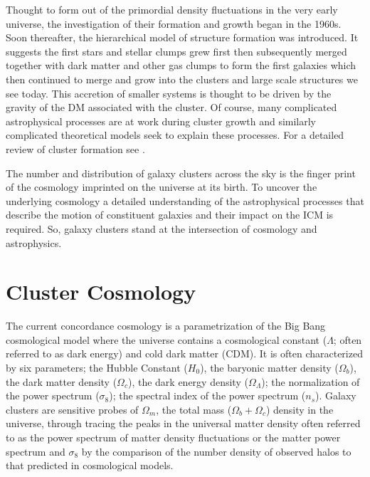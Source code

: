 Thought to form out of the primordial density fluctuations in the very early universe, the investigation of their formation and growth began in the 1960s. Soon thereafter, the hierarchical model of structure formation \citep{Press1974, Gott1975, White1978} was introduced. It suggests the first stars and stellar clumps grew first then subsequently merged together with dark matter and other gas clumps to form the first galaxies which then continued to merge and grow into the clusters and large scale structures we see today. This accretion of smaller systems is thought to be driven by the gravity of the DM associated with the cluster. Of course, many complicated astrophysical processes are at work during cluster growth and similarly complicated theoretical models seek to explain these processes. For a detailed review of cluster formation see \cite{Kravtsov2012}.

The number and distribution of galaxy clusters across the sky is the finger print of the cosmology imprinted on the universe at its birth. To uncover the underlying cosmology a detailed understanding of the astrophysical processes that describe the motion of constituent galaxies and their impact on the ICM is required. So, galaxy clusters stand at the intersection of cosmology and astrophysics. 

\section{Cluster Cosmology}
The current concordance cosmology is a parametrization of the Big Bang cosmological model where the universe contains a cosmological constant ($\Lambda$; often referred to as dark energy) and cold dark matter (CDM). It is often characterized by six parameters; the Hubble Constant ($H_0$), the baryonic matter density ($\Omega_b$), the dark matter density ($\Omega_c$), the dark energy density ($\Omega_\Lambda$); the normalization of the power spectrum ($\sigma_8$); the spectral index of the power spectrum ($n_s$). Galaxy clusters are sensitive probes of $\Omega_m$, the total mass ($\Omega_b + \Omega_c$) density in the universe, through tracing the peaks in the universal matter density often referred to as the power spectrum of matter density fluctuations or the matter power spectrum and $\sigma_8$ by the comparison of the number density of observed halos to that predicted in cosmological models. %

